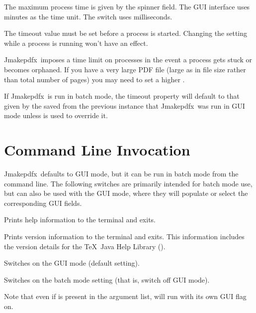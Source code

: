 \documentclass[toc=listof]{scrreport}
\newcommand{\Jmakepdfx}{Jmakepdfx}
\begin{document}
The maximum process time is given by the 
spinner field. The \gls{GUI} interface uses minutes as the time
unit. The  switch uses milliseconds.

\begin{important}
The timeout value must be set before a process is started. Changing
the setting while a process is running won't have an effect.
\end{important}

\Jmakepdfx\ imposes a time limit on processes in the event a process
gets stuck or becomes orphaned. If you have a very large PDF file
(large as in file size rather than total number of pages) you may
need to set a higher .


\begin{information}
If \Jmakepdfx\ is run in batch mode, the timeout property will
default to that given by the saved 
from the previous instance that \Jmakepdfx\ was run in \gls{GUI}
mode unless  is used to override it.
\end{information}


\chapter{Command Line Invocation}
\label{sec:cmdline}


\Jmakepdfx\ defaults to \gls{GUI} mode, but it can be run in batch
mode from the command line. The following switches are primarily
intended for batch mode use, but can also be used with the \gls{GUI}
mode, where they will populate or select the corresponding \gls{GUI} fields.

Prints help information to the terminal and exits.

Prints version information to the terminal and exits.
This information includes the version details for
the \TeX\ Java Help Library ().

Switches on the \gls{GUI} mode (default setting).

Switches on the batch mode setting (that is, switch off \gls{GUI}
mode).

\begin{important}
Note that even if  is present in the argument list, 
 will run with its own \gls{GUI} flag on.
\end{important}
\end{document}

